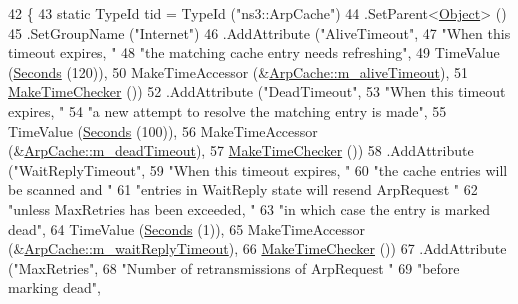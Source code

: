 \begin{DoxyCode}
42 \{
43   \textcolor{keyword}{static} TypeId tid = TypeId (\textcolor{stringliteral}{"ns3::ArpCache"})
44     .SetParent<\hyperlink{classns3_1_1Object_a40860402e64d8008fb42329df7097cdb}{Object}> ()
45     .SetGroupName (\textcolor{stringliteral}{"Internet"})
46     .AddAttribute (\textcolor{stringliteral}{"AliveTimeout"},
47                    \textcolor{stringliteral}{"When this timeout expires, "}
48                    \textcolor{stringliteral}{"the matching cache entry needs refreshing"},
49                    TimeValue (\hyperlink{group__timecivil_ga33c34b816f8ff6628e33d5c8e9713b9e}{Seconds} (120)),
50                    MakeTimeAccessor (&\hyperlink{classns3_1_1ArpCache_a30dc0bd7f1b0fb5847a9df0db1d52add}{ArpCache::m\_aliveTimeout}),
51                    \hyperlink{group__time_ga7032965bd4afa578691d88c09e4481c1}{MakeTimeChecker} ())
52     .AddAttribute (\textcolor{stringliteral}{"DeadTimeout"},
53                    \textcolor{stringliteral}{"When this timeout expires, "}
54                    \textcolor{stringliteral}{"a new attempt to resolve the matching entry is made"},
55                    TimeValue (\hyperlink{group__timecivil_ga33c34b816f8ff6628e33d5c8e9713b9e}{Seconds} (100)),
56                    MakeTimeAccessor (&\hyperlink{classns3_1_1ArpCache_a399aae557ff88496c35d5f6beb842923}{ArpCache::m\_deadTimeout}),
57                    \hyperlink{group__time_ga7032965bd4afa578691d88c09e4481c1}{MakeTimeChecker} ())
58     .AddAttribute (\textcolor{stringliteral}{"WaitReplyTimeout"},
59                    \textcolor{stringliteral}{"When this timeout expires, "}
60                    \textcolor{stringliteral}{"the cache entries will be scanned and "}
61                    \textcolor{stringliteral}{"entries in WaitReply state will resend ArpRequest "}
62                    \textcolor{stringliteral}{"unless MaxRetries has been exceeded, "}
63                    \textcolor{stringliteral}{"in which case the entry is marked dead"},
64                    TimeValue (\hyperlink{group__timecivil_ga33c34b816f8ff6628e33d5c8e9713b9e}{Seconds} (1)),
65                    MakeTimeAccessor (&\hyperlink{classns3_1_1ArpCache_a4369a983ccf79656dbe6066b5fe91814}{ArpCache::m\_waitReplyTimeout}),
66                    \hyperlink{group__time_ga7032965bd4afa578691d88c09e4481c1}{MakeTimeChecker} ())
67     .AddAttribute (\textcolor{stringliteral}{"MaxRetries"},
68                    \textcolor{stringliteral}{"Number of retransmissions of ArpRequest "}
69                    \textcolor{stringliteral}{"before marking dead"},

\end{DoxyCode}
